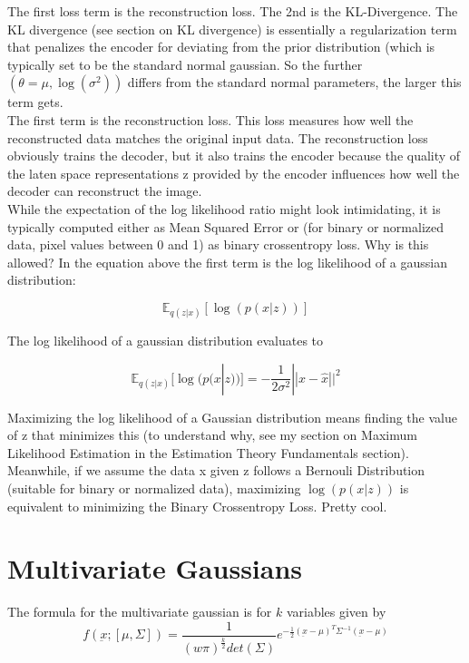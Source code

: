 \documentclass[12pt]{article}
\begin{document}
The first loss term is the reconstruction loss. The 2nd is the KL-Divergence. The KL divergence (see section on KL divergence) is essentially a regularization term that penalizes the encoder for deviating from the prior distribution (which is typically set to be the standard normal gaussian. So the further \((\theta = \mu, \log(\sigma^2))\) differs from the standard normal parameters, the larger this term gets.\\

The first term is the reconstruction loss. This loss measures how well the reconstructed data matches the original input data. The reconstruction loss obviously trains the decoder, but it also trains the encoder because the quality of the laten space representations z provided by the encoder influences how well the decoder can reconstruct the image. \\

While the expectation of the log likelihood ratio might look intimidating, it is typically computed either as Mean Squared Error or (for binary or normalized data, pixel values between 0 and 1) as binary crossentropy loss. Why is this allowed? In the equation above the first term is the log likelihood of a gaussian distribution:

\[ \mathbb{E}_{q(z|x)}[\log(p(x|z))] \]

The log likelihood of a gaussian distribution evaluates to 

\[ \mathbb{E}_{q(z|x)}[\log(p(x|z))] = -\frac{1}{2\sigma^2}|| x - \hat{x}||^2\]

Maximizing the log likelihood of a Gaussian distribution means finding the value of z that minimizes this (to understand why, see my section on Maximum Likelihood Estimation in the Estimation Theory Fundamentals section). \\

Meanwhile, if we assume the data x given z follows a Bernouli Distribution (suitable for binary or normalized data), maximizing \(\log(p(x|z))\) is equivalent to minimizing the Binary Crossentropy Loss. Pretty cool.


\section{Multivariate Gaussians}

The formula for the multivariate gaussian is for \(k\) variables given by 
\[f(\underbar{x}; [\mu, \Sigma]) = \frac{1}{(w\pi)^{\frac{k}{2}}det(\Sigma)}e^{-\frac{1}{2}(\underbar{x} - \mu)^T \Sigma^{-1}(\underbar{x} - \mu)}\]
\end{document}
